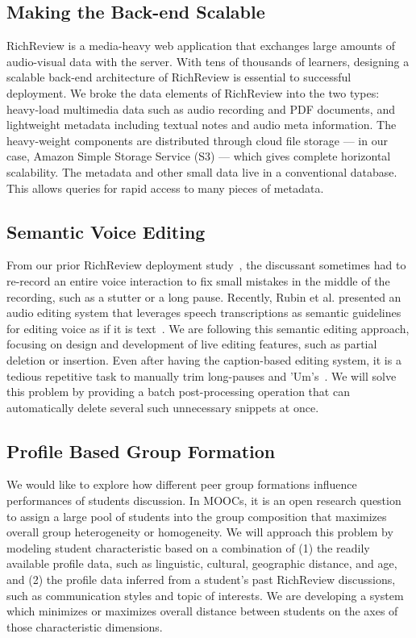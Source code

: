 \documentclass{sigchi}
\begin{document}
\subsection{Making the Back-end Scalable}
RichReview is a media-heavy web application that exchanges large amounts of audio-visual data with the server.
With tens of thousands of learners, designing a scalable back-end architecture of RichReview is essential to successful deployment.
We broke the data elements of RichReview into the two types: heavy-load multimedia data such as audio recording and PDF documents, and lightweight metadata including textual notes and audio meta information.
The heavy-weight components are distributed through cloud file storage --- in our case, Amazon Simple Storage Service (S3) --- which gives complete horizontal scalability. The metadata and other small data live in a conventional database. This allows queries for rapid access to many pieces of metadata.

\subsection{Semantic Voice Editing}
From our prior RichReview deployment study~\cite{yoon2015richreview}, the discussant sometimes had to re-record an entire voice interaction to fix small mistakes in the middle of the recording, such as a stutter or a long pause.
Recently, Rubin et al. presented an audio editing system that leverages speech transcriptions as semantic guidelines for editing voice as if it is text~\cite{rubin2013content}.
We are following this semantic editing approach, focusing on design and development of live editing features, such as partial deletion or insertion.
Even after having the caption-based editing system, it is a tedious repetitive task to manually trim long-pauses and 'Um's~\cite{yoon2014richreview}.
We will solve this problem by providing a batch post-processing operation that can automatically delete several such unnecessary snippets at once.

\subsection{Profile Based Group Formation}
We would like to explore how different peer group formations influence performances of students discussion. 
In MOOCs, it is an open research question to assign a large pool of students into the group composition that maximizes overall group heterogeneity or homogeneity.
We will approach this problem by modeling student characteristic based on a combination of (1) the readily available profile data, such as linguistic, cultural, geographic distance, and age, and (2) the profile data inferred from a student's past RichReview discussions, such as communication styles and topic of interests.
We are developing a system which minimizes or maximizes overall distance between students on the axes of those characteristic dimensions.
\end{document}
